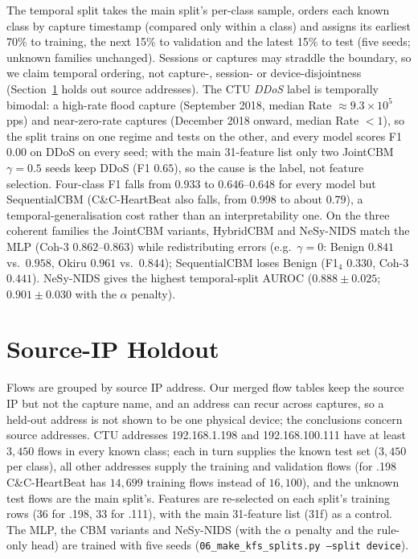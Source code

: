 \documentclass[journal]{IEEEtran}
\begin{document}
The temporal split takes the main split's per-class sample, orders each known class by capture
timestamp (compared only within a class) and assigns its earliest 70\% to training, the next 15\% to
validation and the latest 15\% to test (five seeds; unknown families unchanged). Sessions or
captures may straddle the boundary, so we claim temporal ordering, not capture-, session- or
device-disjointness (Section~\ref{sec:device} holds out source addresses). The CTU \emph{DDoS} label
is temporally bimodal: a high-rate flood capture (September 2018, median Rate
${\approx}9.3{\times}10^{5}$\,pps) and near-zero-rate captures (December 2018 onward, median Rate
${<}1$), so the split trains on one regime and tests on the other, and every model scores F1 $0.00$
on DDoS on every seed; with the main 31-feature list only two JointCBM $\gamma{=}0.5$ seeds keep DDoS
(F1 $0.65$), so the cause is the label, not feature selection. Four-class F1 falls from $0.933$ to
$0.646$--$0.648$ for every model but SequentialCBM (C\&C-HeartBeat also falls, from $0.998$ to about
$0.79$), a temporal-generalisation cost rather than an interpretability one. On the three coherent
families the JointCBM variants, HybridCBM and NeSy-NIDS match the MLP (Coh-3 $0.862$--$0.863$) while
redistributing errors (e.g.\ $\gamma{=}0$: Benign $0.841$ vs.\ $0.958$, Okiru $0.961$ vs.\ $0.844$);
SequentialCBM loses Benign (F1$_4$ $0.330$, Coh-3 $0.441$). NeSy-NIDS gives the highest temporal-split
AUROC ($0.888{\pm}0.025$; $0.901{\pm}0.030$ with the $\alpha$ penalty).

\section{Source-IP Holdout}
\label{sec:device}

Flows are grouped by source IP address. Our merged flow tables keep the source IP but not the
capture name, and an address can recur across captures, so a held-out address is not shown to be
one physical device; the conclusions concern source addresses. CTU addresses 192.168.1.198 and
192.168.100.111 have at least $3{,}450$ flows in every known class; each in turn supplies the known
test set ($3{,}450$ per class), all other addresses supply the training and validation flows (for
.198 C\&C-HeartBeat has $14{,}699$ training flows instead of $16{,}100$), and the unknown test flows
are the main split's. Features are re-selected on each split's training rows (36 for .198, 33 for
.111), with the main 31-feature list (31f) as a control. The MLP, the CBM variants and NeSy-NIDS
(with the $\alpha$ penalty and the rule-only head) are trained with five seeds
(\texttt{06\_make\_kfs\_splits.py --split device}).
\end{document}
